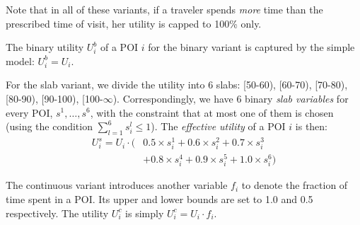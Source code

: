 Note that in all of these variants, if a traveler spends \emph{more} time
than the prescribed time of visit, her utility is capped to 100\% only.

The binary utility $U^b_i$ of a POI $i$ for the binary variant is captured
by the simple model: $U^b_i = U_i$.

For the slab variant, we divide the utility into 6 slabs: [50-60), [60-70),
[70-80), [80-90), [90-100), [100-$\infty$).  Correspondingly, we have 6 binary \emph{slab
variables} for every POI, $s^1, \dots, s^6$, with the constraint that at
most one of them is chosen (using the condition $\sum_{l=1}^6 s^l_i \leq 1$).  The \emph{effective
utility} of a POI $i$ is then:
%
\begin{align}
	\label{eq:slab}
	U^s_i = U_i \cdot ( & 0.5 \times s^1_i + 0.6 \times s^2_i + 0.7 \times s^3_i \nonumber \\
		& + 0.8 \times s^4_i + 0.9 \times s^5_i + 1.0 \times s^6_i )
\end{align}
%

The continuous variant introduces another variable $f_i$ to denote the fraction of time spent in a POI.
Its upper and lower bounds are set to 1.0 and 0.5 respectively.
The utility $U^c_i$ is simply $U^c_i = U_i \cdot f_i$.

